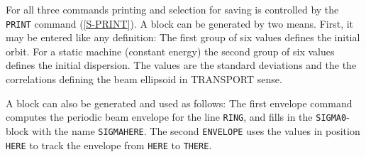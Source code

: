 For all three commands printing and selection for saving is controlled
by the {\tt PRINT} command (\ref{S-PRINT}).
A  block can be generated by two means.
First, it may be entered like any definition:
The first group of six values defines the initial orbit.
For a static machine (constant energy) the second group of six values
defines the initial dispersion.
The values  are the standard deviations and the
 the correlations defining the beam ellipsoid in
TRANSPORT sense.
\label{S_SAVSIG}

A  block can also be generated and used as follows:
The first envelope command computes the periodic beam envelope for the
line {\tt RING}, and fills in the {\tt SIGMA0}-block with the name
{\tt SIGMAHERE}.
The second {\tt ENVELOPE} uses the values in position {\tt HERE} to
track the envelope from {\tt HERE} to {\tt THERE}.
 
